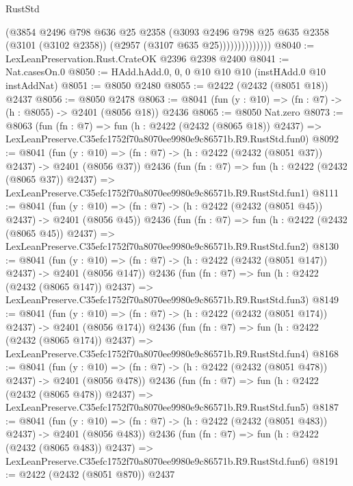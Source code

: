 \begin{lexlean}{RustStd}
\begin{coremodule}
                        (@3854
                          @2496
                          @798
                          @636
                          @25
                          @2358
                          (@3093
                            @2496
                            @798
                            @25
                            @635
                            @2358
                            (@3101 (@3102 @2358))
                            (@2957 (@3107 @635 @25))))))))))))))
@8040 := LexLeanPreservation.Rust.CrateOK @2396 @2398 @2400
@8041 := Nat.casesOn.{0}
@8050 := HAdd.hAdd.{0, 0, 0} @10 @10 @10 (instHAdd.{0} @10 instAddNat)
@8051 := @8050 @2480
@8055 := @2422 (@2432 (@8051 @18)) @2437
@8056 := @8050 @2478
@8063 := @8041 (fun (y : @10) => (fn : @7) -> (h : @8055) -> @2401 (@8056 @18)) @2436
@8065 := @8050 Nat.zero
@8073 := @8063
    (fun (fn : @7) =>
    fun (h : @2422 (@2432 (@8065 @18)) @2437) =>
    LexLeanPreserve.C35efc1752f70a8070ee9980e9c86571b.R9.RustStd.fun0)
@8092 := @8041
    (fun (y : @10) => (fn : @7) -> (h : @2422 (@2432 (@8051 @37)) @2437) -> @2401 (@8056 @37))
    @2436
    (fun (fn : @7) =>
    fun (h : @2422 (@2432 (@8065 @37)) @2437) =>
    LexLeanPreserve.C35efc1752f70a8070ee9980e9c86571b.R9.RustStd.fun1)
@8111 := @8041
    (fun (y : @10) => (fn : @7) -> (h : @2422 (@2432 (@8051 @45)) @2437) -> @2401 (@8056 @45))
    @2436
    (fun (fn : @7) =>
    fun (h : @2422 (@2432 (@8065 @45)) @2437) =>
    LexLeanPreserve.C35efc1752f70a8070ee9980e9c86571b.R9.RustStd.fun2)
@8130 := @8041
    (fun (y : @10) => (fn : @7) -> (h : @2422 (@2432 (@8051 @147)) @2437) -> @2401 (@8056 @147))
    @2436
    (fun (fn : @7) =>
    fun (h : @2422 (@2432 (@8065 @147)) @2437) =>
    LexLeanPreserve.C35efc1752f70a8070ee9980e9c86571b.R9.RustStd.fun3)
@8149 := @8041
    (fun (y : @10) => (fn : @7) -> (h : @2422 (@2432 (@8051 @174)) @2437) -> @2401 (@8056 @174))
    @2436
    (fun (fn : @7) =>
    fun (h : @2422 (@2432 (@8065 @174)) @2437) =>
    LexLeanPreserve.C35efc1752f70a8070ee9980e9c86571b.R9.RustStd.fun4)
@8168 := @8041
    (fun (y : @10) => (fn : @7) -> (h : @2422 (@2432 (@8051 @478)) @2437) -> @2401 (@8056 @478))
    @2436
    (fun (fn : @7) =>
    fun (h : @2422 (@2432 (@8065 @478)) @2437) =>
    LexLeanPreserve.C35efc1752f70a8070ee9980e9c86571b.R9.RustStd.fun5)
@8187 := @8041
    (fun (y : @10) => (fn : @7) -> (h : @2422 (@2432 (@8051 @483)) @2437) -> @2401 (@8056 @483))
    @2436
    (fun (fn : @7) =>
    fun (h : @2422 (@2432 (@8065 @483)) @2437) =>
    LexLeanPreserve.C35efc1752f70a8070ee9980e9c86571b.R9.RustStd.fun6)
@8191 := @2422 (@2432 (@8051 @870)) @2437

\end{coremodule}
\end{lexlean}
